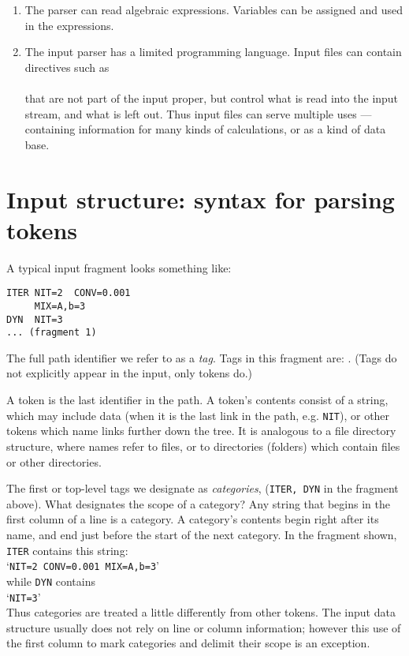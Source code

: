 \documentclass{article}
\begin{document}
\begin{enumerate}
\item The parser can read algebraic expressions. Variables can be assigned
      and used in the expressions.

\item The input parser has a limited programming language.  Input files can
      contain directives such as \\
        \indent {} \\
      that are not part of the input proper, but control what is read into
      the input stream, and what is left out.  Thus input files can serve
      multiple uses --- containing information for many kinds of
      calculations, or as a kind of data base.

\end{enumerate}

\section{\large Input structure: syntax for parsing tokens}
\label{sec:input-struct}

A typical input fragment looks something like:
\begin{verbatim}
ITER NIT=2  CONV=0.001
     MIX=A,b=3
DYN  NIT=3
... (fragment 1)
\end{verbatim}
The full path
identifier we refer to as a \emph{tag}.  Tags in this fragment are:
.\quad
(Tags do not explicitly appear in the input, only tokens do.)

\vskip 6pt\noindent A token is the last identifier in the path.  A token's contents
consist of a string, which may include data (when it is the last link in
the path, e.g. {\tt{}NIT}), or other tokens which name links
further down the tree.
It is analogous to a file directory structure, where names refer to
files, or to directories (folders) which contain files or other directories.  

\vskip 6pt\noindent The first or top-level tags we designate as
\emph{categories}, ({\tt ITER, DYN} in the fragment above). 
What designates the scope of a category?  Any string that begins in the
first column of a line is a category.  A category's contents begin right
after its name, and end just before the start of the next category.
In the fragment shown,
{\tt ITER} contains this string:\\
\indent `{\tt NIT=2 CONV=0.001 MIX=A,b=3}'\\
while {\tt DYN} contains\\
\indent `{\tt NIT=3}'\\
Thus categories are treated a little differently from other tokens.  The
input data structure usually does not rely on line or column information;
however this use of the first column to mark categories and delimit their
scope is an exception.
\end{document}

